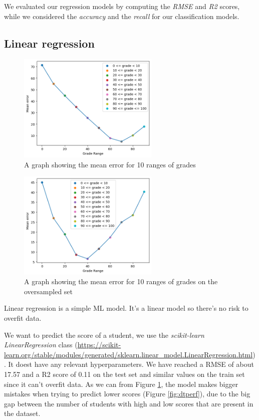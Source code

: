 \documentclass{article}
\begin{document}
We evaluated our regression models by computing the \textit{RMSE} and \textit{R2} scores, while we considered the \textit{accuracy} and the \textit{recall} for our classification models.

\subsection{Linear regression}
\FloatBarrier

\begin{figure}[h]
    \centering
    \includegraphics[width=0.6\textwidth]{grades_errors.png}
    \caption{A graph showing the mean error for 10 ranges of grades}
    \label{fig:errorGraph}
\end{figure}

\begin{figure}[h]
    \centering
    \includegraphics[width=0.6\textwidth]{grades_errors2.png}
    \caption{A graph showing the mean error for 10 ranges of grades on the oversampled set}
    \label{fig:errorGraph2}
\end{figure}

Linear regression is a simple ML model. It's a linear model so there's no risk to overfit data.

We want to predict the score of a student, we use the \textit{scikit-learn LinearRegression} class (\url{https://scikit-learn.org/stable/modules/generated/sklearn.linear_model.LinearRegression.html}). It doest have any relevant hyperparameters.
We have reached a RMSE of about 17.57 and a R2 score of 0.11 on the test set and similar values on the train set since it can't overfit data.
As we can from Figure \ref{fig:errorGraph}, the model makes bigger mistakes when trying to predict lower scores (Figure \ref{fig:dtperf}), due to the big gap between the number of students with high and low scores that are present in the dataset. 
\end{document}
